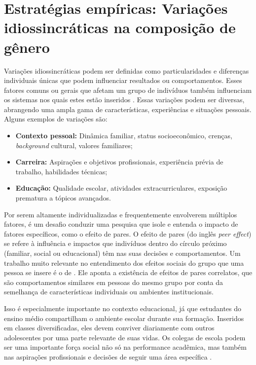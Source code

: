 \section{Estratégias empíricas: Variações idiossincráticas na composição de gênero}
\label{sec:variacoes}
Variações idiossincráticas podem ser definidas como particularidades e diferenças individuais únicas que podem influenciar resultados ou comportamentos. Esses fatores comuns ou gerais que afetam um grupo de indivíduos também influenciam os sistemas nos quais estes estão inseridos \autocite{Meister1991}. Essas variações podem ser diversas, abrangendo uma ampla gama de características, experiências e situações pessoais. Alguns exemplos de variações são:

\begin{itemize}
  \item \textbf{Contexto pessoal:} Dinâmica familiar, status socioeconômico, crenças, \textit{background} cultural, valores familiares;
  \item \textbf{Carreira:} Aspirações e objetivos profissionais, experiência prévia de trabalho, habilidades técnicas; 
  \item \textbf{Educação:} Qualidade escolar, atividades extracurriculares, exposição prematura a tópicos avançados. 
\end{itemize}

Por serem altamente individualizadas e frequentemente envolverem múltiplos fatores, é um desafio conduzir uma pesquisa que isole e entenda o impacto de fatores específicos, como o efeito de pares. O efeito de pares (do inglês \textit{peer effect}) se refere à influência e impactos que indivíduos dentro do círculo próximo (familiar, social ou educacional) têm nas suas decisões e comportamentos. Um trabalho muito relevante no entendimento dos efeitos sociais do grupo que uma pessoa se insere é o de \citet{Manski1993}. Ele aponta a existência de efeitos de pares correlatos, que são comportamentos similares em pessoas do mesmo grupo por conta da semelhança de características individuais ou ambientes institucionais.

Isso é especialmente importante no contexto educacional, já que estudantes do ensino médio compartilham o ambiente escolar durante sua formação. Inseridos em classes diversificadas, eles devem conviver diariamente com outros adolescentes por uma parte relevante de suas vidas. Os colegas de escola podem ser uma importante força social não só na performance acadêmica, mas também nas aspirações profissionais e decisões de seguir uma área específica \autocite{Tang2008}.  

